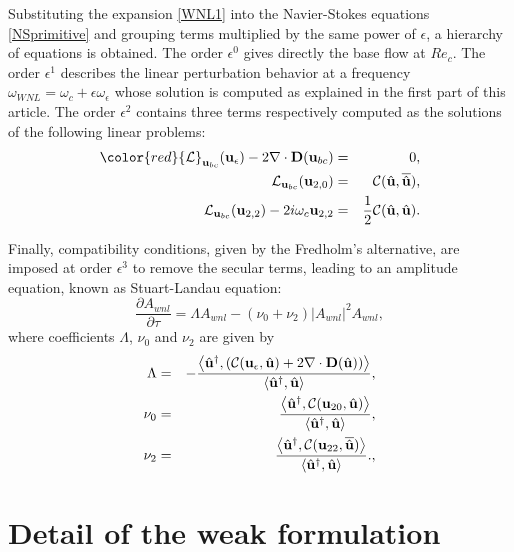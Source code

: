 \documentclass[twocolumn,10pt]{asme2ej}
\newcommand{\be}[1]{ \begin{equation} \label{#1}}
\newcommand{\ee}{\end{equation}}
\begin{document}
Substituting the expansion \ref{WNL1} into the Navier-Stokes equations \ref{NSprimitive} and grouping terms multiplied by the same power of $\epsilon$, a hierarchy of equations is obtained. {\color{red} The order $\epsilon^0$ gives directly the base flow at $Re_c$. The order $\epsilon^1$ describes the linear perturbation behavior at a frequency $\omega_{WNL}=\omega_c+\epsilon\omega_\epsilon$ whose solution is computed as explained in the first part of this article.}
The order $\epsilon^2$ contains three terms respectively computed as the solutions of the following linear problems:
\begin{eqnarray}
{\color{red} {\cal L}_{{\bf u}_{bc}} ({\bf u}_\epsilon) - 2 \nabla \cdot {\bf D}({\bf u}_{bc})} &=&0,\\
{\cal L}_{{\bf u}_{bc}} ({\bf u}_{2,0}) &=& {\cal C}(\hat{\bf u},\overline{\hat{\bf u}}),\\
{\cal L}_{{\bf u}_{bc}} ({\bf u}_{2,2}) - 2 i \omega_c {\bf u}_{2,2}  &=& \frac{1}{2} {\cal C}(\hat{\bf u},\hat{\bf u}).
 \end{eqnarray}

Finally, compatibility conditions, {\color{red}given by the Fredholm's alternative, are imposed at order $\epsilon^3$ to remove the secular terms, leading to an amplitude equation, known as Stuart-Landau equation:
\be{WNL3}
\frac{\partial A_{wnl}}{\partial \tau} = \Lambda A_{wnl} - (\nu_0+\nu_2)  |A_{wnl}|^2 A_{wnl},
\ee
}
where coefficients $\Lambda$, $\nu_0$ and $\nu_2$ are given by
{\color{red}
\begin{eqnarray}
\Lambda &=& -\frac{ \left< {\hat{\bf u}}^\dag, 
\left( {\cal C}({\bf u}_\epsilon, \hat{\bf u}) + 2 \nabla \cdot  {\bf D}( \hat{\bf u}) \right) \right>}
{  \left<  \hat{\bf u}^\dag,\hat{\bf u} \right> },\label{LAMBDA}\\
\nu_0 &=& \frac{ \left< {\hat{\bf u}}^\dag,  {\cal C}({\bf u}_{20}, \hat{\bf u} ) \right>}
{  \left<  \hat{\bf u}^\dag,\hat{\bf u} \right> },\label{NU0}\\
\nu_2 &=& \frac{ \left< {\hat{\bf u}}^\dag,  {\cal C}({\bf u}_{22}, \overline{\hat{\bf u}})  \right>}
{  \left<  \hat{\bf u}^\dag,\hat{\bf u} \right> }.,\label{NU2}
 \end{eqnarray}
}

\section{Detail of the weak formulation}
\end{document}

